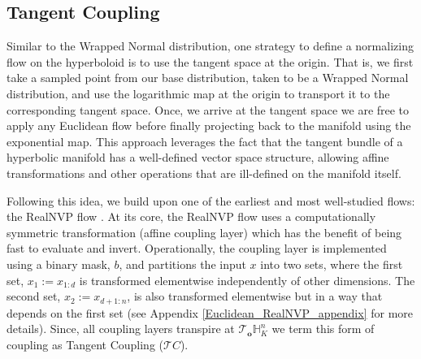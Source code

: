 \subsection{Tangent Coupling}
Similar to the Wrapped Normal distribution, one strategy to define a normalizing flow on the hyperboloid is to use the tangent space at the origin. That is, we first take a sampled point from our base distribution, taken to be a Wrapped Normal distribution, and use the logarithmic map at the origin to transport it to the corresponding tangent space. Once, we arrive at the tangent space we are free to apply any Euclidean flow before finally projecting back to the manifold using the exponential map. 
This approach leverages the fact that the tangent bundle of a hyperbolic manifold has a well-defined vector space structure, allowing affine transformations and other operations that are ill-defined on the manifold itself. 

Following this idea, we build upon one of the earliest and most well-studied flows: the RealNVP flow \cite{dinh2016density}. At its core, the RealNVP flow uses a computationally symmetric transformation (affine coupling layer) which has the benefit of being fast to evaluate and invert. Operationally, the coupling layer is implemented using a binary mask, $b$, and partitions the input $x$ into two sets, where the first set, $x_1:=x_{1:d}$ is transformed elementwise independently of other dimensions. The second set, $x_2:=x_{d+1:n}$, is also transformed elementwise but in a way that depends on the first set (see Appendix \ref{Euclidean_RealNVP_appendix} for more details). Since, all coupling layers transpire at $\mathcal{T}_{\textbf{o}}\mathbb{H}^n_K$ we term this form of coupling as Tangent Coupling ($\mathcal{T}C$). 

